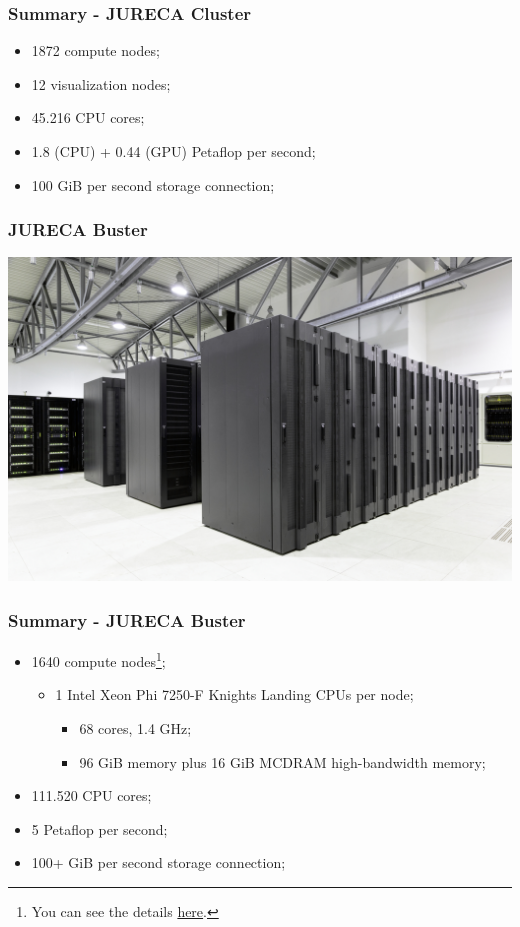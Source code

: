 \documentclass{beamer}
\begin{document}
\begin{frame}
  \frametitle{Summary - JURECA Cluster}
  \begin{itemize}
    \item 1872 compute nodes;
    \item 12 visualization nodes;
    \item 45.216 CPU cores;
    \item 1.8 (CPU) + 0.44 (GPU) Petaflop per second;
    \item 100 GiB per second storage connection;
  \end{itemize}
\end{frame}

\begin{frame}
  \frametitle{JURECA Buster}
  \includegraphics[width=\textwidth]{./images/jureca-buster.jpeg}
\end{frame}

\begin{frame}
  \frametitle{Summary - JURECA Buster}
  \begin{itemize}
    \item 1640 compute nodes\footnote{You can see the details \href{https://www.fz-juelich.de/ias/jsc/EN/Expertise/Supercomputers/JURECA/Configuration/Configuration_node.html}{here}.};
          \begin{itemize}
            \item 1 Intel Xeon Phi 7250-F Knights Landing CPUs per node;
                  \begin{itemize}
                    \item 68 cores, 1.4 GHz;
                    \item 96 GiB memory plus 16 GiB MCDRAM high-bandwidth memory;
                  \end{itemize}
          \end{itemize}
    \item 111.520 CPU cores;
    \item 5 Petaflop per second;
    \item 100+ GiB per second storage connection;
  \end{itemize}
\end{frame}
\end{document}
